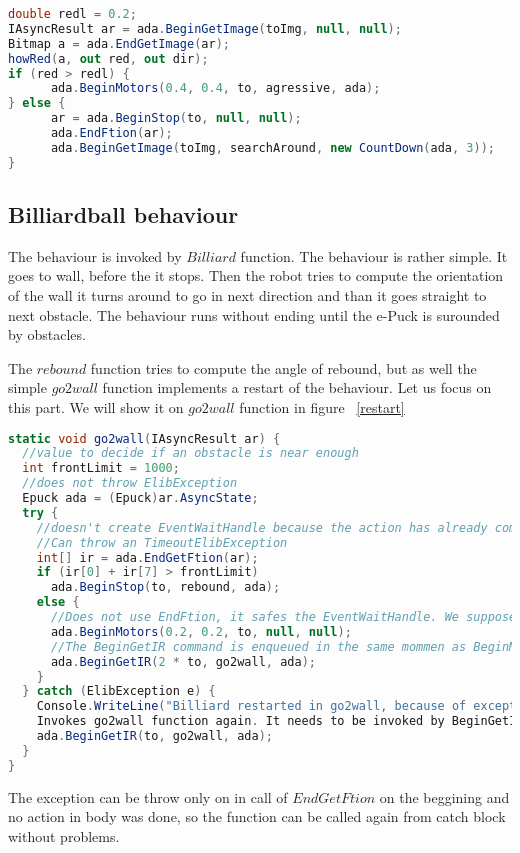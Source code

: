\begin{lstlisting}[language=cs]
double redl = 0.2;
IAsyncResult ar = ada.BeginGetImage(toImg, null, null);
Bitmap a = ada.EndGetImage(ar);
howRed(a, out red, out dir);
if (red > redl) {
      ada.BeginMotors(0.4, 0.4, to, agressive, ada);
} else {
      ar = ada.BeginStop(to, null, null);
      ada.EndFtion(ar);
      ada.BeginGetImage(toImg, searchAround, new CountDown(ada, 3));
}
\end{lstlisting}
	
\subsection{Billiardball behaviour}\label{billiard}
	The behaviour is invoked by $Billiard$ function. The behaviour is rather simple.
	It goes to wall, before the it stops. Then the robot tries to compute the
	orientation of the wall it turns around to go in next direction and than it goes straight
	to next obstacle.
	The behaviour runs without ending until the e-Puck is surounded by obstacles.

	The $rebound$ function tries to compute the angle of rebound, but as well the simple $go2wall$ function
	implements a restart of the behaviour.
	Let us focus on this part. We will show it on $go2wall$ function in figure ~\ref{restart}

\begin{lstlisting}[language=cs]
static void go2wall(IAsyncResult ar) {
  //value to decide if an obstacle is near enough
  int frontLimit = 1000;  
  //does not throw ElibException
  Epuck ada = (Epuck)ar.AsyncState;
  try {
    //doesn't create EventWaitHandle because the action has already completed synchronously.
    //Can throw an TimeoutElibException
    int[] ir = ada.EndGetFtion(ar);    
    if (ir[0] + ir[7] > frontLimit)
      ada.BeginStop(to, rebound, ada);
    else {
      //Does not use EndFtion, it safes the EventWaitHandle. We suppose, that it succeeds now or in next rounds.
      ada.BeginMotors(0.2, 0.2, to, null, null);
      //The BeginGetIR command is enqueued in the same mommen as BeginMotors, therefor 2*to.
      ada.BeginGetIR(2 * to, go2wall, ada);
    }
  } catch (ElibException e) {
    Console.WriteLine("Billiard restarted in go2wall, because of exception:\n" + e.Message);
    Invokes go2wall function again. It needs to be invoked by BeginGetIR command, because it expects ar with IR values.
    ada.BeginGetIR(to, go2wall, ada);
  }
}
\end{lstlisting}
	The exception can be throw only on in call of $EndGetFtion$ on the beggining and 
	no action in body was done, so the function can be called again from catch block without problems.

